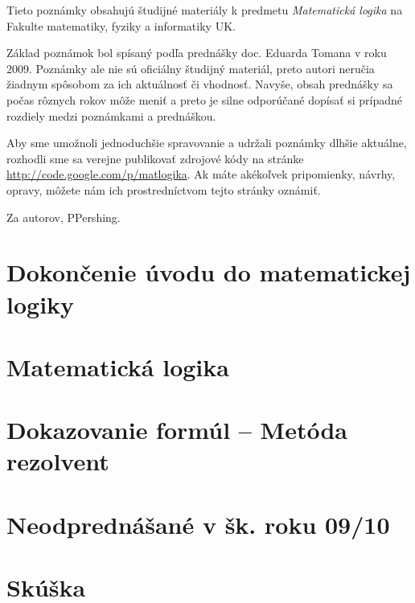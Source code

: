 \documentclass[a4paper]{report}
\begin{document}
Tieto poznámky obsahujú študijné materiály
k predmetu \emph{Matematická logika}
na Fakulte matematiky, fyziky a informatiky UK.

Základ poznámok bol spísaný podľa prednášky doc. Eduarda Tomana v roku 2009.
Poznámky ale nie sú oficiálny študijný materiál, preto autori neručia
žiadnym spôsobom za ich aktuálnosť či vhodnosť. Navyše, obsah prednášky sa
počas rôznych rokov môže meniť a preto je silne odporúčané dopísať si
prípadné rozdiely medzi poznámkami a prednáškou.

Aby sme umožnoli jednoduchšie spravovanie a udržali poznámky dlhšie
aktuálne, rozhodli sme sa verejne publikovať zdrojové kódy na stránke
\url{http://code.google.com/p/matlogika}. Ak máte akékoľvek pripomienky,
návrhy, opravy, môžete nám ich prostredníctvom tejto stránky oznámiť.

Za autorov, PPershing.

\tableofcontents

\chapter{Dokončenie úvodu do matematickej logiky}





\chapter{Matematická logika}





\chapter{Dokazovanie formúl -- Metóda rezolvent}










\chapter{Neodprednášané v šk. roku 09/10}


\chapter{Skúška}

\end{document}
